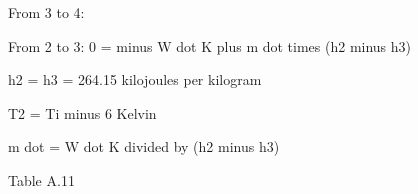 From 3 to 4:  

From 2 to 3:  
0 = minus W dot K plus m dot times (h2 minus h3)  

h2 =  
h3 = 264.15 kilojoules per kilogram  

T2 = Ti minus 6 Kelvin  

m dot = W dot K divided by (h2 minus h3)  

Table A.11
